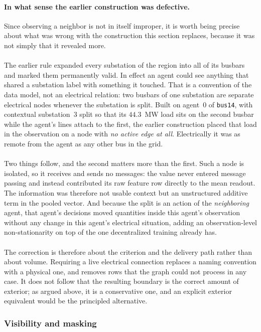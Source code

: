 {\paragraph{In what sense the earlier construction was defective.}
Since observing a neighbor is not in itself improper, it is worth being precise
about what was wrong with the construction this section replaces, because it was
not simply that it revealed more.
\\
\\
The earlier rule expanded every substation of the region into all of its
busbars and marked them permanently valid. In effect an agent could see anything
that shared a substation label with something it touched. That is a convention
of the data model, not an electrical relation: two busbars of one substation are
separate electrical nodes whenever the substation is split. Built on agent~$0$
of \texttt{bus14}, with contextual substation~$3$ split so that its $44.3$~MW
load sits on the second busbar while the agent's lines attach to the first, the
earlier construction placed that load in the observation on a node with
\emph{no active edge at all}. Electrically it was as remote from the agent as any
other bus in the grid.
\\
\\
Two things follow, and the second matters more than the first. Such a node is
isolated, so it receives and sends no messages: the value never entered message
passing and instead contributed its raw feature row directly to the mean
readout. The information was therefore not usable context but an unstructured
additive term in the pooled vector. And because the split is an action of the
\emph{neighboring} agent, that agent's decisions moved quantities inside this
agent's observation without any change in this agent's electrical situation,
adding an observation-level non-stationarity on top of the one decentralized
training already has.
\\
\\
The correction is therefore about the criterion and the delivery path rather
than about volume. Requiring a live electrical connection replaces a naming
convention with a physical one, and removes rows that the graph could not
process in any case. It does not follow that the resulting boundary is the
correct amount of exterior; as argued above, it is a conservative one, and an
explicit exterior equivalent would be the principled alternative.
}

\subsubsection{Visibility and masking}

